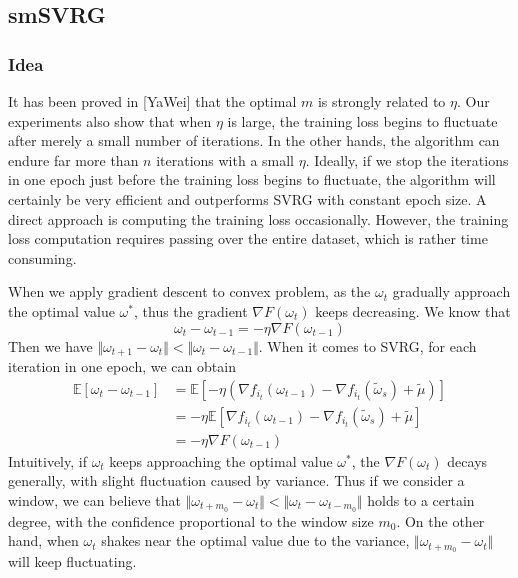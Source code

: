 \documentclass[conference]{IEEEtran}
\begin{document}
 \subsection{smSVRG}
 \subsubsection{Idea}
 It has been proved in [YaWei] that the optimal $m$ is strongly related to $\eta$. Our experiments also show that when $\eta$ is large, the training loss begins to fluctuate after merely a small number of iterations. In the other hands, the algorithm can endure far more than $n$ iterations with a small $\eta$. Ideally, if we stop the iterations in one epoch just before the training loss begins to fluctuate, the algorithm will certainly be very efficient and outperforms SVRG with constant epoch size. A direct approach is computing the training loss occasionally. However, the training loss computation requires passing over the entire dataset, which is rather time consuming. 

 When we apply gradient descent to convex problem, as the $\omega_t$ gradually approach the optimal value $\omega^*$, thus the gradient $\nabla F(\omega_t)$ keeps decreasing. We know that
 $$\omega_t - \omega_{t-1} = -\eta\nabla F(\omega_{t-1})$$
 Then we have $\Vert\omega_{t+1}-\omega_t\Vert<\Vert\omega_{t}-\omega_{t-1}\Vert$. 
When it comes to SVRG, for each iteration in one epoch, we can obtain
 \begin{equation}
\label{sgdinequality}
\begin{split}
\mathbb{E}[\omega_t -\omega_{t-1}] &=  \mathbb{E}[- \eta(\nabla f_{i_t}(\omega_{t-1}) - \nabla f_{i_t}(\tilde{\omega}_s)+\tilde{\mu})]\\
&=-\eta\mathbb{E}[\nabla f_{i_t}(\omega_{t-1}) - \nabla f_{i_t}(\tilde{\omega}_s)+\tilde{\mu}]\\
&=-\eta\nabla F(\omega_{t-1})
\end{split}
\end{equation}
 Intuitively, if $\omega_t$ keeps approaching the optimal value $\omega^*$, the $\nabla F(\omega_{t})$ decays generally, with slight fluctuation caused by variance. Thus if we consider a window, we can believe that $\Vert\omega_{t+m_0}-\omega_t\Vert<\Vert\omega_{t}-\omega_{t-m_0}\Vert$ holds to a certain degree, with the confidence proportional to the window size $m_0$. 
 On the other hand, when $\omega_t$ shakes near the optimal value due to the variance, $\Vert\omega_{t+m_0}-\omega_t\Vert$ will keep fluctuating. 
\end{document}

